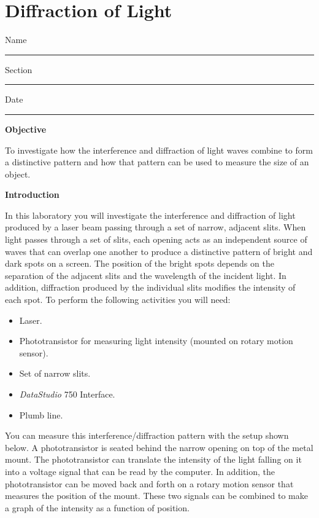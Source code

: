 
\section{Diffraction of Light}

Name \rule{2.0in}{0.1pt}\hfill{}Section \rule{1.0in}{0.1pt}\hfill{}Date
\rule{1.0in}{0.1pt}

\textbf{Objective}

To investigate how the interference and diffraction of light waves
combine to form a distinctive pattern and how that pattern can be
used to measure the size of an object.

\textbf{Introduction}

In this laboratory you will investigate the interference and diffraction
of light produced by a laser beam passing through a set of narrow,
adjacent slits. When light passes through a set of slits, each opening
acts as an independent source of waves that can overlap one another
to produce a distinctive pattern of bright and dark spots on a screen.
The position of the bright spots depends on the separation of the
adjacent slits and the wavelength of the incident light. In addition,
diffraction produced by the individual slits modifies the intensity
of each spot. To perform the following activities you will need:

\begin{itemize}
\item Laser.
\item Phototransistor for measuring light intensity (mounted on rotary motion sensor).
\item Set of narrow slits.
\item {\it DataStudio} 750 Interface.
\item Plumb line.
\end{itemize}
You can measure this interference/diffraction pattern with the setup
shown below. A phototransistor is seated behind the narrow opening on top
of the metal mount. The phototransistor can translate the intensity
of the light falling on it into a voltage signal that can be read
by the computer. In addition, the phototransistor can be moved back and
forth on a rotary motion sensor that measures the position of the 
mount.
These two signals can be combined to
make a graph of the intensity as a function of position.

